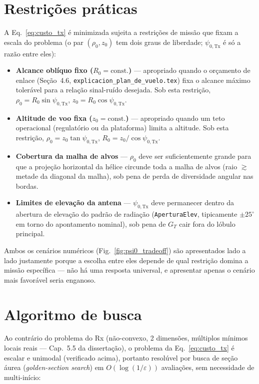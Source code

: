 \documentclass[12pt,a4paper,oneside]{book}
\theoremstyle{definition}
\theoremstyle{remark}
\newcommand{\psiT}{\psi_{0,\mathrm{Tx}}}
\begin{document}
\section{Restrições práticas}
\label{sec:restricoes}

A Eq.~\eqref{eq:custo_tx} é minimizada sujeita a restrições de missão que
fixam a escala do problema (o par $(\rho_0,z_0)$ tem dois graus de
liberdade; $\psiT$ é só a razão entre eles):

\begin{itemize}
  \item \textbf{Alcance oblíquo fixo ($R_0=\text{const.}$)} — apropriado
  quando o orçamento de enlace (Seção~4.6, \texttt{explicacion\_plan\_de\_vuelo.tex})
  fixa o alcance máximo tolerável para a relação sinal-ruído desejada. Sob
  esta restrição, $\rho_0=R_0\sin\psiT$, $z_0=R_0\cos\psiT$.

  \item \textbf{Altitude de voo fixa ($z_0=\text{const.}$)} — apropriado
  quando um teto operacional (regulatório ou da plataforma) limita a
  altitude. Sob esta restrição, $\rho_0=z_0\tan\psiT$, $R_0=z_0/\cos\psiT$.

  \item \textbf{Cobertura da malha de alvos} — $\rho_0$ deve ser
  suficientemente grande para que a projeção horizontal da hélice
  circunde toda a malha de alvos (raio $\gtrsim$ metade da diagonal da
  malha), sob pena de perda de diversidade angular nas bordas.

  \item \textbf{Limites de elevação da antena} — $\psiT$ deve permanecer
  dentro da abertura de elevação do padrão de radiação
  (\texttt{AperturaElev}, tipicamente $\pm 25^\circ$ em torno do
  apontamento nominal), sob pena de $G_T$ cair fora do lóbulo principal.
\end{itemize}

Ambos os cenários numéricos (Fig.~\ref{fig:psi0_tradeoff}) são
apresentados lado a lado justamente porque a escolha entre eles depende de
qual restrição domina a missão específica — não há uma resposta universal,
e apresentar apenas o cenário mais favorável seria enganoso.

\section{Algoritmo de busca}

Ao contrário do problema do Rx (não-convexo, 2 dimensões, múltiplos
mínimos locais reais — Cap.~5.5 da dissertação), o problema da
Eq.~\eqref{eq:custo_tx} é escalar e unimodal (verificado acima), portanto
resolúvel por busca de seção áurea (\textit{golden-section search}) em
$O(\log(1/\varepsilon))$ avaliações, sem necessidade de multi-início:
\end{document}
